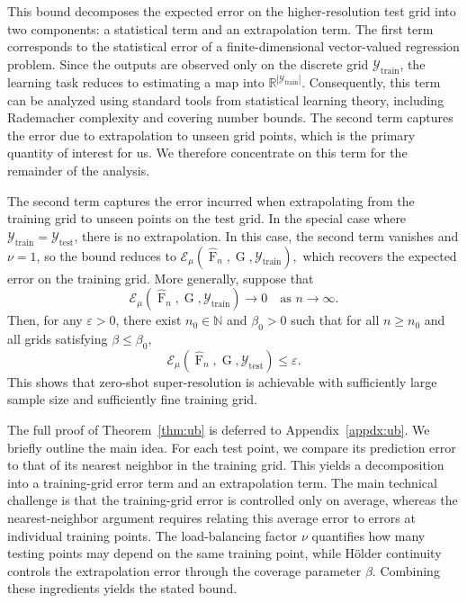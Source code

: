 \documentclass[11pt]{article}
\theoremstyle{plain}
\newcommand{\naturals}{\mathbb{N}}
\newcommand{\Ycal}{\mathcal{Y}}
\begin{document}
This bound decomposes the expected error on the higher-resolution test grid into two components: a statistical term and an extrapolation term. The first term corresponds to the statistical error of a finite-dimensional vector-valued regression problem. Since the outputs are observed only on the discrete grid $\Ycal_{\mathrm{train}}$, the learning task reduces to estimating a map into $\mathbb{R}^{|\Ycal_{\mathrm{train}}|}$. Consequently, this term can be analyzed using standard tools from statistical learning theory, including Rademacher complexity and covering number bounds. The second term captures the error due to extrapolation to unseen grid points, which is the primary quantity of interest for us. We therefore concentrate on this term for the remainder of the analysis.

The second term captures the error incurred when extrapolating from the training grid to unseen points on the test grid. In the special case where $\Ycal_{\mathrm{train}} = \Ycal_{\mathrm{test}}$, there is no extrapolation. In this case, the second term vanishes and $\nu = 1$, so the bound reduces to $
\mathcal{E}_{\mu}(\widehat{\operatorname{F}}_n, \operatorname{G}, \Ycal_{\mathrm{train}}),$
which recovers the expected error on the training grid. More generally, suppose that 
\[
\mathcal{E}_{\mu}(\widehat{\operatorname{F}}_n, \operatorname{G}, \Ycal_{\mathrm{train}}) \to 0
\quad \text{as } n \to \infty.
\]
Then, for any $\varepsilon > 0$, there exist $n_0 \in \naturals$ and $\beta_0 > 0$ such that for all $n \ge n_0$ and all grids satisfying $\beta \le \beta_0$,
\[
\mathcal{E}_{\mu}(\widehat{\operatorname{F}}_n, \operatorname{G}, \Ycal_{\mathrm{test}}) \le \varepsilon.
\]
This shows that zero-shot super-resolution is achievable with sufficiently large sample size and sufficiently fine training grid. 


The full proof of Theorem~\ref{thm:ub} is deferred to Appendix~\ref{appdx:ub}. We briefly outline
the main idea. For each test point, we compare its prediction error to that
of its nearest neighbor in the training grid. This yields a decomposition
into a training-grid error term and an extrapolation term. The main technical
challenge is that the training-grid error is controlled only on average,
whereas the nearest-neighbor argument requires relating this average error to
errors at individual training points. The load-balancing factor $\nu$
quantifies how many testing points may depend on the same training point,
while H\"older continuity controls the extrapolation error through the
coverage parameter $\beta$. Combining these ingredients yields the stated
bound.
\end{document}
